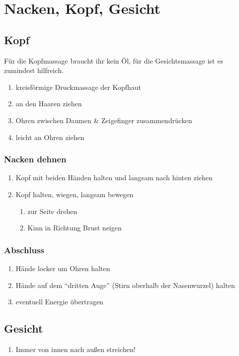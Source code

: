 \section{Nacken, Kopf, Gesicht}

\subsection{Kopf}

Für die Kopfmassage braucht ihr kein Öl, für die Gesichtsmassage ist es zumindest hilfreich.

\begin{enumerate}
\item kreisförmige Druckmassage der Kopfhaut
\item an den Haaren ziehen
\item Ohren zwischen Daumen \& Zeigefinger zusammendrücken
\item leicht an Ohren ziehen
\end{enumerate}

\subsubsection{Nacken dehnen}
\begin{enumerate}
\item Kopf mit beiden Händen halten und langsam nach hinten ziehen
\item Kopf halten, wiegen, langsam bewegen
	\begin{enumerate}
	\item zur Seite drehen
	\item Kinn in Richtung Brust neigen
	\end{enumerate}
\end{enumerate}

\subsubsection{Abschluss}
\begin{enumerate}
\item Hände locker um Ohren halten
\item Hände auf dem "`dritten Auge"' (Stirn oberhalb der Nasenwurzel) halten
\item eventuell Energie übertragen
\end{enumerate}


\subsection{Gesicht}
\begin{enumerate}
\item Immer von innen nach außen streichen!
\end{enumerate}

